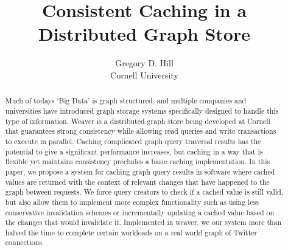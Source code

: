 \documentclass[letterpaper,twocolumn,11pt,tight]{article}
\begin{document}
\newtheorem{claim}{Claim}
\newtheorem{defn}{Definition}
\newcommand{\hilight}[1]{\colorbox{yellow}{#1}}
\newcommand{\secref}[1]{Section~\ref{sec:#1}}
\newcommand{\figref}[1]{Figure~\ref{fig:#1}}
\newcommand{\srcref}[1]{Figure~\ref{fig:#1}}
\newcommand{\clmref}[1]{Claim~\ref{claim:#1}}
\newcommand{\insertfig}[4]{\begin{figure}\centering\texttt{[image: \#2]}\caption{#3}\label{fig:#4}\end{figure}}
\newcommand{\insertsrc}[3]{\begin{figure}\centering\caption{#2}\label{fig:#3}\end{figure}}

\title{Consistent Caching in a Distributed Graph Store}

\author{\rm Gregory D. Hill \qquad
        \\Cornell University}

\maketitle
\begin{abstract}
Much of todays `Big Data' is graph structured, and multiple companies and universities have introduced graph storage systems specifically designed to handle this type of information.
Weaver is a distributed graph store being developed at Cornell that guarantees strong consistency while allowing read queries and write transactions to execute in parallel.
Caching complicated graph query traversal results has the potential to give a significant performance increases,
but caching in a way that is flexible yet maintains consistency precludes a basic caching implementation.
In this paper, we propose a system for caching graph query results in software where cached values are returned with the context of relevant changes that have happened to the graph between requests.
We force query creators to check if a cached value is still valid, but also allow them to implement more complex functionality such as using less conservative invalidation schemes or incrementally updating a cached value based on the changes that would invalidate it.
Implemented in weaver, we our system more than halved the time to complete certain workloads on a real world graph of Twitter connections.
\end{abstract}
\end{document}
